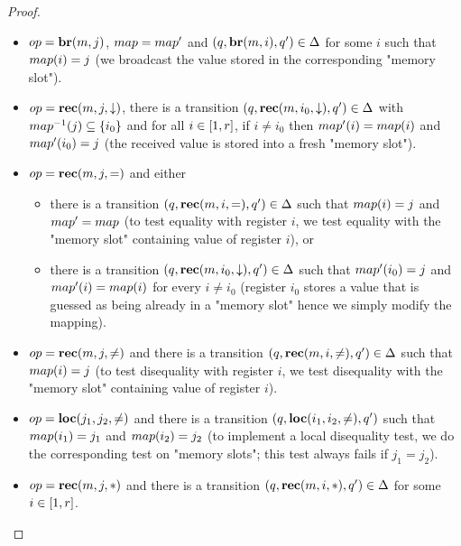\begin{proof}
	\begin{itemize}
		\item $\op = \br{m}{j}$, 
		$\map = \map'$ and $(q, \textbf{br}(m, i), q') \in \Delta$ for some $i$ such that $\map(i) = j$ (we broadcast the value stored in the corresponding "memory slot").
		
		\item $\op=\rec{m}{j}{\enregact}$, there is a transition $(q, \textbf{rec}(m, i_0, \downarrow), q') \in \Delta$ with $\map^{-1}(j) \subseteq \set{i_0}$ and for all $i \in [1,r]$, if $i \ne i_0$ then $\map'(i) = \map(i)$ and $\map'(i_0) = j$ (the received value is stored into a fresh "memory slot").
		
		\item $\op = \rec{m}{j}{\eqtestact}$ and either
		\begin{itemize}
			\item there is a transition $(q, \textbf{rec}(m, i, {=}), q') \in \Delta$ such that $\map(i)=j$ and $\map'=\map$ (to test equality with register $i$, we test equality with the "memory slot" containing value of register $i$), or
			
			\item there is a transition $(q, \textbf{rec}(m, i_0, \downarrow), q') \in \Delta$ such that $\map'(i_0)=j$ and $\map'(i) = \map(i)$ for every $i \neq i_0$ (register $i_0$ stores a value that is guessed as being already in a "memory slot" hence we simply modify the mapping).
		\end{itemize} 
		
		\item $\op = \rec{m}{j}{\diseqtestact}$ and there is a transition $(q, \textbf{rec}(m, i, {\ne}), q') \in \Delta$ such that $\map(i)=j$ (to test disequality with register $i$, we test disequality with the "memory slot" containing value of register $i$).
		

		\item $\op=\loc{j_1}{j_2}{\diseqtestact}$ and there is a transition $(q, \textbf{loc}(i_1,i_2,{\ne}), q')$ such that $\map(i_1)=j_1$ and $\map(i_2) = j_2$ (to implement a local disequality test, we do the corresponding test on "memory slots"; this test always fails if $j_1 = j_2$).
		
		
		\item $\op = \rec{m}{j}{\dummyact}$ and there is a transition $(q, \textbf{rec}(m, i, {*}), q') \in \Delta$ for some $i \in [1,r]$.
	\end{itemize}
	

\end{proof}
